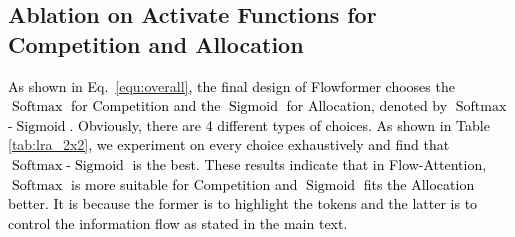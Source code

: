 \documentclass[nohyperref]{article}
\theoremstyle{plain}
\theoremstyle{definition}
\theoremstyle{remark}
\newcommand{\update}[1]{{\textcolor{black}{#1}}}
\begin{document}
\subsection{Ablation on Activate Functions for Competition and Allocation}

\update{As shown in Eq.~\eqref{equ:overall}, the final design of Flowformer chooses the $\operatorname{Softmax}$ for Competition and the $\operatorname{Sigmoid}$ for Allocation, denoted by $\operatorname{Softmax}$-$\operatorname{Sigmoid}$. Obviously, there are 4 different types of choices. As shown in Table \ref{tab:lra_2x2}, we experiment on every choice exhaustively and find that $\operatorname{Softmax}$-$\operatorname{Sigmoid}$ is the best. These results indicate that in Flow-Attention, $\operatorname{Softmax}$ is more suitable for Competition and $\operatorname{Sigmoid}$ fits the Allocation better. It is because the former is to highlight the tokens and the latter is to control the information flow as stated in the main text.}

\begin{table}[h]
    \vspace{-15pt}
	\caption{Accuracy results (\%) on LRA (averaged from 5 sub-tasks).}
	\vspace{-5pt}
	\label{tab:lra_2x2}
	\vskip 0.1in
	\centering
	\begin{small}
		\begin{sc}
			\renewcommand{\multirowsetup}{\centering}
			\setlength{\tabcolsep}{10pt}
		\end{sc}
	\end{small}
	\vspace{-7pt}
\end{table}
\end{document}
